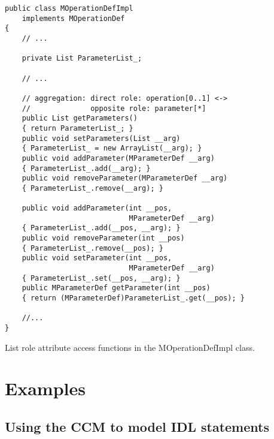 \begin{Example}
\begin{minifbox}
\begin{small}
\begin{verbatim}
public class MOperationDefImpl
    implements MOperationDef
{
    // ...

    private List ParameterList_;

    // ...

    // aggregation: direct role: operation[0..1] <->
    //              opposite role: parameter[*]
    public List getParameters()
    { return ParameterList_; }
    public void setParameters(List __arg)
    { ParameterList_ = new ArrayList(__arg); }
    public void addParameter(MParameterDef __arg)
    { ParameterList_.add(__arg); }
    public void removeParameter(MParameterDef __arg)
    { ParameterList_.remove(__arg); }

    public void addParameter(int __pos,
                             MParameterDef __arg)
    { ParameterList_.add(__pos, __arg); }
    public void removeParameter(int __pos)
    { ParameterList_.remove(__pos); }
    public void setParameter(int __pos,
                             MParameterDef __arg)
    { ParameterList_.set(__pos, __arg); }
    public MParameterDef getParameter(int __pos)
    { return (MParameterDef)ParameterList_.get(__pos); }

    //...
}
\end{verbatim}
\end{small}
\end{minifbox}
\caption{List role attribute access functions in the MOperationDefImpl class.}
\label{example:metamodel-list-attribute-impl}
\end{Example}

\section{Examples}

\subsection{Using the CCM to model IDL statements}


